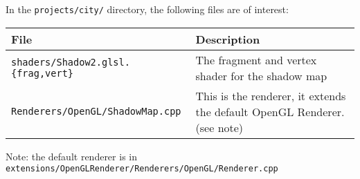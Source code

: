 In the \texttt{projects/city/} directory, the following files are of interest:

\begin{center} 
  \begin{tabular}{|l|p{5cm}|}
    \hline 
    \textbf{File} & \textbf{Description} \\ \hline 
    \texttt{shaders/Shadow2.glsl.\{frag,vert\}} 
    & The fragment and vertex shader for the shadow map \\ \hline
    \texttt{Renderers/OpenGL/ShadowMap.cpp} 
    & This is the renderer, it extends the default OpenGL Renderer. (see note) \\ \hline    
  \end{tabular}
\end{center}

Note: the default renderer is in \\
\texttt{extensions/OpenGLRenderer/Renderers/OpenGL/Renderer.cpp}


